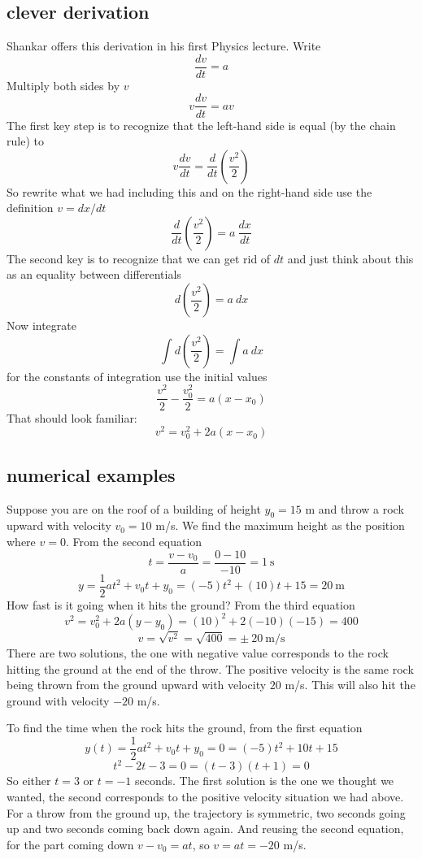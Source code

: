 \documentclass[11pt, oneside]{article}
\begin{document}
\subsection*{clever derivation}
Shankar offers this derivation in his first Physics lecture.  Write
\[ \frac{dv}{dt} = a \]
Multiply both sides by $v$
\[ v \frac{dv}{dt} = av \]
The first key step is to recognize that the left-hand side is equal (by the chain rule) to 
\[ v \frac{dv}{dt} = \frac{d}{dt} (\frac{v^2}{2}) \]
So rewrite what we had including this and on the right-hand side use the definition $v = dx/dt$
\[ \frac{d}{dt} (\frac{v^2}{2}) = a \ \frac{dx}{dt} \]
The second key is to recognize that we can get rid of $dt$ and just think about this as an equality between differentials
\[ d(\frac{v^2}{2}) = a \ dx \]
Now integrate
\[ \int d(\frac{v^2}{2}) = \int a \ dx \]
for the constants of integration use the initial values
\[ \frac{v^2}{2} - \frac{v_0^2}{2} = a (x - x_0) \]
That should look familiar:
\[ v^2 = v_0^2 + 2a (x - x_0) \]

\subsection*{numerical examples}
Suppose you are on the roof of a building of height $y_0=15$ m and throw a rock upward with velocity $v_0=10$ m/s.  We find the maximum height as the position where $v=0$.  From the second equation
\[ t = \frac{v-v_0}{a} = \frac{0 - 10}{-10} = 1 \ \text{s} \]
\[ y = \frac{1}{2}at^2 + v_0t + y_0 =  (-5) t^2 + (10) t + 15 = 20 \ \text{m} \]
How fast is it going when it hits the ground?  From the third equation
\[ v^2 = v_0^2 + 2a(y - y_0) = (10)^2 + 2(-10)(-15) = 400 \]
\[ v = \sqrt{v^2} = \sqrt{400} = \pm \ 20 \ \text{m/s} \]
There are two solutions, the one with negative value corresponds to the rock hitting the ground at the end of the throw.  The positive velocity is the same rock being thrown from the ground upward with velocity $20$ m/s.  This will also hit the ground with velocity $-20$ m/s.  

To find the time when the rock hits the ground, from the first equation
\[ y(t) = \frac{1}{2}at^2 + v_0t + y_0 = 0 = (-5)t^2 + 10t + 15 \]
\[ t^2 - 2t - 3 = 0 = (t-3)(t+1) = 0 \]
So either $t = 3$ or $t = -1$ seconds.  The first solution is the one we thought we wanted, the second corresponds to the positive velocity situation we had above.  For a throw from the ground up, the trajectory is symmetric, two seconds going up and two seconds coming back down again.  And reusing the second equation, for the part coming down $v - v_0 = at$, so  $v = at = -20$ m/s.
\end{document}
